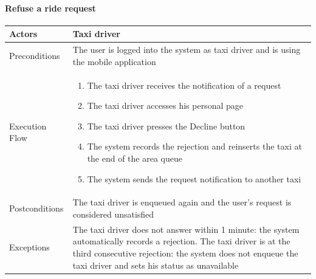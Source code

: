 		\paragraph{Refuse a ride request}
			\begin{center}
				\begin{tabular}{ | l | p{8cm} |}
					\hline Actors & Taxi driver
					\\ \hline
					Preconditions &
					The user is logged into the system as taxi driver and is using the mobile application
					\\ \hline
					Execution Flow &
					\begin{enumerate}
						\item The taxi driver receives the notification of a request
						\item The taxi driver accesses his personal page
						\item The taxi driver presses the Decline button
						\item The system records the rejection and reinserts the taxi at the end of
						the area queue
						\item The system sends the request notification to another taxi
					\end{enumerate}
					\\ \hline
					Postconditions & The taxi driver is enqueued again and the user's request
					is considered unsatisfied
					\\ \hline
					Exceptions &
					The taxi driver does not answer within 1 minute:
					the system automatically records a rejection.
					The taxi driver is at the third consecutive rejection:
					the system does not enqueue the taxi driver and sets his status as unavailable
					\\ \hline
				\end{tabular}
			\end{center}